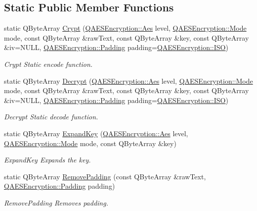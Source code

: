 \subsection*{Static Public Member Functions}
\begin{DoxyCompactItemize}
\item 
static Q\+Byte\+Array \hyperlink{class_q_a_e_s_encryption_a43819eeb6a7cb29fbd3cb6ad640dcbdf}{Crypt} (\hyperlink{class_q_a_e_s_encryption_abe48208f4f6c7d68e6a10b49b9d0b7bd}{Q\+A\+E\+S\+Encryption\+::\+Aes} level, \hyperlink{class_q_a_e_s_encryption_ad3e031c49a3d56566379d75b40b7b255}{Q\+A\+E\+S\+Encryption\+::\+Mode} mode, const Q\+Byte\+Array \&raw\+Text, const Q\+Byte\+Array \&key, const Q\+Byte\+Array \&iv=N\+U\+LL, \hyperlink{class_q_a_e_s_encryption_ab0a65cdea4eac21ef32530010d1b0247}{Q\+A\+E\+S\+Encryption\+::\+Padding} padding=\hyperlink{class_q_a_e_s_encryption_ab0a65cdea4eac21ef32530010d1b0247a4fb686e6a16d4242ff35311d2e7c422d}{Q\+A\+E\+S\+Encryption\+::\+I\+SO})
\begin{DoxyCompactList}\small\item\em Crypt Static encode function. \end{DoxyCompactList}\item 
static Q\+Byte\+Array \hyperlink{class_q_a_e_s_encryption_af9baa154a06683049d941bd06ac698fd}{Decrypt} (\hyperlink{class_q_a_e_s_encryption_abe48208f4f6c7d68e6a10b49b9d0b7bd}{Q\+A\+E\+S\+Encryption\+::\+Aes} level, \hyperlink{class_q_a_e_s_encryption_ad3e031c49a3d56566379d75b40b7b255}{Q\+A\+E\+S\+Encryption\+::\+Mode} mode, const Q\+Byte\+Array \&raw\+Text, const Q\+Byte\+Array \&key, const Q\+Byte\+Array \&iv=N\+U\+LL, \hyperlink{class_q_a_e_s_encryption_ab0a65cdea4eac21ef32530010d1b0247}{Q\+A\+E\+S\+Encryption\+::\+Padding} padding=\hyperlink{class_q_a_e_s_encryption_ab0a65cdea4eac21ef32530010d1b0247a4fb686e6a16d4242ff35311d2e7c422d}{Q\+A\+E\+S\+Encryption\+::\+I\+SO})
\begin{DoxyCompactList}\small\item\em Decrypt Static decode function. \end{DoxyCompactList}\item 
static Q\+Byte\+Array \hyperlink{class_q_a_e_s_encryption_a2112456e057e6dd886694348fbf202cd}{Expand\+Key} (\hyperlink{class_q_a_e_s_encryption_abe48208f4f6c7d68e6a10b49b9d0b7bd}{Q\+A\+E\+S\+Encryption\+::\+Aes} level, \hyperlink{class_q_a_e_s_encryption_ad3e031c49a3d56566379d75b40b7b255}{Q\+A\+E\+S\+Encryption\+::\+Mode} mode, const Q\+Byte\+Array \&key)
\begin{DoxyCompactList}\small\item\em Expand\+Key Expands the key. \end{DoxyCompactList}\item 
static Q\+Byte\+Array \hyperlink{class_q_a_e_s_encryption_abb2887bf5623a74053dd19627f3d3055}{Remove\+Padding} (const Q\+Byte\+Array \&raw\+Text, \hyperlink{class_q_a_e_s_encryption_ab0a65cdea4eac21ef32530010d1b0247}{Q\+A\+E\+S\+Encryption\+::\+Padding} padding)
\begin{DoxyCompactList}\small\item\em Remove\+Padding Removes padding. \end{DoxyCompactList}\end{DoxyCompactItemize}


